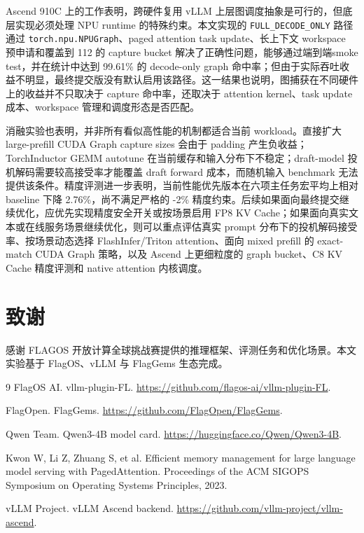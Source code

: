 \documentclass[UTF8,10.5pt]{ctexart}
\newcommand{\code}[1]{\texttt{#1}}
\begin{document}
Ascend 910C 上的工作表明，跨硬件复用 vLLM 上层图调度抽象是可行的，但底层实现必须处理 NPU runtime 的特殊约束。本文实现的 \code{FULL\_DECODE\_ONLY} 路径通过 \code{torch.npu.NPUGraph}、paged attention task update、长上下文 workspace 预申请和覆盖到 112 的 capture bucket 解决了正确性问题，能够通过端到端smoke test，并在统计中达到 99.61\% 的 decode-only graph 命中率；但由于实际吞吐收益不明显，最终提交版没有默认启用该路径。这一结果也说明，图捕获在不同硬件上的收益并不只取决于 capture 命中率，还取决于 attention kernel、task update 成本、workspace 管理和调度形态是否匹配。

消融实验也表明，并非所有看似高性能的机制都适合当前 workload。直接扩大 large-prefill CUDA Graph capture sizes 会由于 padding 产生负收益；TorchInductor GEMM autotune 在当前缓存和输入分布下不稳定；draft-model 投机解码需要较高接受率才能覆盖 draft forward 成本，而随机输入 benchmark 无法提供该条件。精度评测进一步表明，当前性能优先版本在六项主任务宏平均上相对 baseline 下降 2.76\%，尚不满足严格的 -2\% 精度约束。后续如果面向最终提交继续优化，应优先实现精度安全开关或按场景启用 FP8 KV Cache；如果面向真实文本或在线服务场景继续优化，则可以重点评估真实 prompt 分布下的投机解码接受率、按场景动态选择 FlashInfer/Triton attention、面向 mixed prefill 的 exact-match CUDA Graph 策略，以及 Ascend 上更细粒度的 graph bucket、C8 KV Cache 精度评测和 native attention 内核调度。

\section*{致谢}

感谢 FLAGOS 开放计算全球挑战赛提供的推理框架、评测任务和优化场景。本文实验基于 FlagOS、vLLM 与 FlagGems 生态完成。

\begin{thebibliography}{9}
FlagOS AI. vllm-plugin-FL. \url{https://github.com/flagos-ai/vllm-plugin-FL}.

FlagOpen. FlagGems. \url{https://github.com/FlagOpen/FlagGems}.

Qwen Team. Qwen3-4B model card. \url{https://huggingface.co/Qwen/Qwen3-4B}.

Kwon W, Li Z, Zhuang S, et al. Efficient memory management for large language model serving with PagedAttention. Proceedings of the ACM SIGOPS Symposium on Operating Systems Principles, 2023.

vLLM Project. vLLM Ascend backend. \url{https://github.com/vllm-project/vllm-ascend}.
\end{thebibliography}
\end{document}
